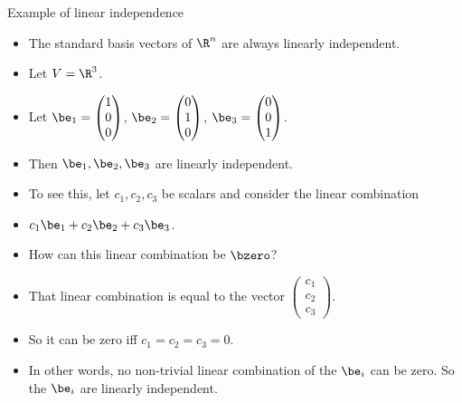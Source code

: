 \documentclass{beamer}
\begin{document}
\begin{frame}{Example of linear independence}

\begin{itemize}
\item The standard basis vectors of $\R^n$ are always linearly independent.
\item Let $V = \R^3$.
\item Let $\be_1 =
\begin{pmatrix}
1 \\ 0 \\ 0
\end{pmatrix}
$,
$\be_2 =
\begin{pmatrix}
0 \\ 1 \\ 0
\end{pmatrix}
$,
$\be_3=
\begin{pmatrix}
0 \\ 0 \\ 1
\end{pmatrix}
$.

\item Then $\be_1,\be_2,\be_3$ are linearly independent.
\item To see this, let $c_1,c_2,c_3$ be scalars and consider the linear combination
\item $c_1\be_1+c_2\be_2+c_3\be_3$.
\item How can this linear combination be $\bzero$?
\item That linear combination is equal to the vector
$
\begin{pmatrix}
c_1 \\ c_2 \\ c_3
\end{pmatrix}
$.
\item So it can be zero iff $c_1=c_2=c_3=0$.
\item In other words, no non-trivial linear combination of the $\be_i$ can be zero.
So the $\be_i$ are linearly independent.
\end{itemize}

\end{frame}
\end{document}
